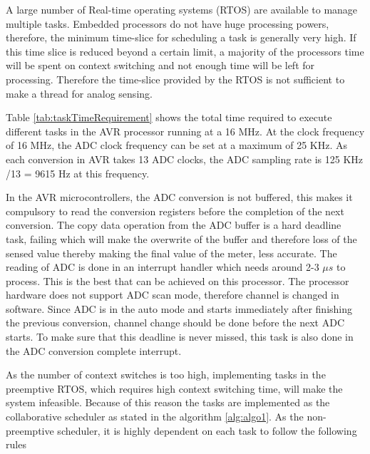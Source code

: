A large number of Real-time operating systems (RTOS) are available to manage multiple tasks. Embedded processors do not have huge processing powers, therefore, the minimum time-slice for scheduling a task is generally very high. If this time slice is reduced beyond a certain limit, a majority of the processors time will be spent on context switching and not enough time will be left for processing. Therefore the time-slice provided by the RTOS is not sufficient to make a thread for analog sensing.

Table \ref{tab:taskTimeRequirement} shows the total time required to execute different tasks in the AVR processor running at a 16 MHz. At the clock frequency of 16 MHz, the ADC clock frequency can be set at a maximum of 25 KHz. As each conversion in AVR takes 13 ADC clocks, the ADC sampling rate is 125 KHz /13 = 9615 Hz at this frequency.

In the AVR microcontrollers, the ADC conversion is not buffered, this makes it compulsory to read the conversion registers before the completion of the next conversion. The copy data operation from the ADC buffer is a hard deadline task, failing which will make the overwrite of the buffer and therefore loss of the sensed value thereby making the final value of the meter, less accurate. The reading of ADC is done in an interrupt handler which needs around 2-3 $\mu s$ to process. This is the best that can be achieved on this processor. The processor hardware does not support ADC scan mode, therefore channel is changed in software. Since ADC is in the auto mode and starts immediately after finishing the previous conversion, channel change should be done before the next ADC starts. To make sure that this deadline is never missed, this task is also done in the ADC conversion complete interrupt.

As the number of context switches is too high, implementing tasks in the preemptive RTOS, which requires high context switching time, will make the system infeasible. Because of this reason the tasks are implemented as the collaborative scheduler as stated in the algorithm \ref{alg:algo1}. As the non-preemptive scheduler, it is highly dependent on each task to follow the following rules

